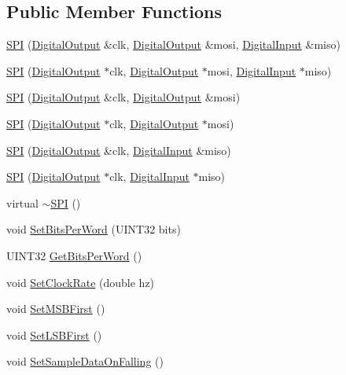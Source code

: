 \subsection*{Public Member Functions}
\begin{DoxyCompactItemize}
\item 
\hyperlink{classSPI_ab8a031abcb911915f2221324211f37b4}{SPI} (\hyperlink{classDigitalOutput}{DigitalOutput} \&clk, \hyperlink{classDigitalOutput}{DigitalOutput} \&mosi, \hyperlink{classDigitalInput}{DigitalInput} \&miso)
\item 
\hyperlink{classSPI_a5a9ff16c1b36056d2bab48c8bb9dd58f}{SPI} (\hyperlink{classDigitalOutput}{DigitalOutput} $\ast$clk, \hyperlink{classDigitalOutput}{DigitalOutput} $\ast$mosi, \hyperlink{classDigitalInput}{DigitalInput} $\ast$miso)
\item 
\hyperlink{classSPI_aa99a1d66d364cb0ec749026660fb8bd2}{SPI} (\hyperlink{classDigitalOutput}{DigitalOutput} \&clk, \hyperlink{classDigitalOutput}{DigitalOutput} \&mosi)
\item 
\hyperlink{classSPI_a8de2c7b9a8484df3e4588afa5ed47178}{SPI} (\hyperlink{classDigitalOutput}{DigitalOutput} $\ast$clk, \hyperlink{classDigitalOutput}{DigitalOutput} $\ast$mosi)
\item 
\hyperlink{classSPI_a1ff8fa9eb4cf60ec5238c5797651afec}{SPI} (\hyperlink{classDigitalOutput}{DigitalOutput} \&clk, \hyperlink{classDigitalInput}{DigitalInput} \&miso)
\item 
\hyperlink{classSPI_a74dd16adaa9ca26845ebc2f8c61379fa}{SPI} (\hyperlink{classDigitalOutput}{DigitalOutput} $\ast$clk, \hyperlink{classDigitalInput}{DigitalInput} $\ast$miso)
\item 
virtual \hyperlink{classSPI_a6babebf1ea3e8ff0330f43a3e2312ac4}{$\sim$SPI} ()
\item 
void \hyperlink{classSPI_af1d668c7056784c19d2d7b494e3c214a}{SetBitsPerWord} (UINT32 bits)
\item 
UINT32 \hyperlink{classSPI_a6dea6f0679df0018fd19b52f0bb06347}{GetBitsPerWord} ()
\item 
void \hyperlink{classSPI_a27b450354fc78eb4441e7d59f8fe65f2}{SetClockRate} (double hz)
\item 
void \hyperlink{classSPI_a66ed807d9a76400a74e815837b3ff32b}{SetMSBFirst} ()
\item 
void \hyperlink{classSPI_acd12e6ca307ec0dc0fb80f4cc9aa6ee3}{SetLSBFirst} ()
\item 
void \hyperlink{classSPI_a463dc7cb26d0b865c44c73538bc23ae0}{SetSampleDataOnFalling} ()
\item 

\end{DoxyCompactItemize}
